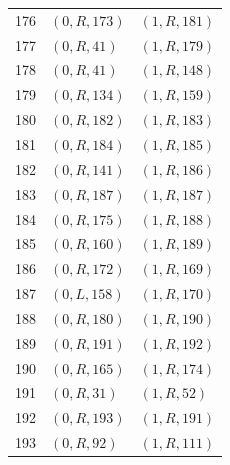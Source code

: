 \begin{longtable}{@{}rll@{}}
176 & $(0,R,173)$ & $(1,R,181)$\\
177 & $(0,R,41)$ & $(1,R,179)$\\
178 & $(0,R,41)$ & $(1,R,148)$\\
179 & $(0,R,134)$ & $(1,R,159)$\\
180 & $(0,R,182)$ & $(1,R,183)$\\
181 & $(0,R,184)$ & $(1,R,185)$\\
182 & $(0,R,141)$ & $(1,R,186)$\\
183 & $(0,R,187)$ & $(1,R,187)$\\
184 & $(0,R,175)$ & $(1,R,188)$\\
185 & $(0,R,160)$ & $(1,R,189)$\\
186 & $(0,R,172)$ & $(1,R,169)$\\
187 & $(0,L,158)$ & $(1,R,170)$\\
188 & $(0,R,180)$ & $(1,R,190)$\\
189 & $(0,R,191)$ & $(1,R,192)$\\
190 & $(0,R,165)$ & $(1,R,174)$\\
191 & $(0,R,31)$ & $(1,R,52)$\\
192 & $(0,R,193)$ & $(1,R,191)$\\
193 & $(0,R,92)$ & $(1,R,111)$\\
\end{longtable}
\endgroup
\clearpage
